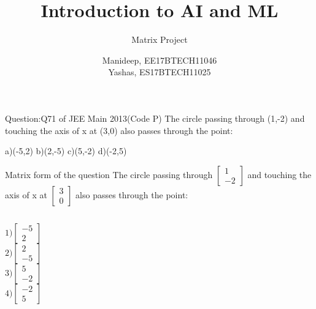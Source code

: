 \documentclass{beamer}
\title{Introduction to AI and ML}
\subtitle{Matrix Project}
\author{Manideep, EE17BTECH11046 \\ Yashas, ES17BTECH11025}
\begin{document}
\begin{frame}

\titlepage
 
\end{frame}  

\begin{frame}[t]{Question:Q71 of JEE Main 2013(Code P)}
\vspace{5em}
The circle passing through (1,-2) and touching the axis of x at (3,0) also passes through the point:

\vspace{1.5em}
\hspace{1.5em} a)(-5,2) \hspace{1.5em} b)(2,-5) \hspace{1.5em} c)(5,-2) \hspace{1.5em} d)(-2,5)
\vspace{1.5em}
\end{frame}

\begin{frame}[t]{Matrix form of the question}
\vspace{5em}
The circle passing through
$
\begin{bmatrix}
1\\
-2
\end{bmatrix}$
and touching the axis of x at
$
\begin{bmatrix}
3\\
0
\end{bmatrix}$
also passes through the point:
\begin{columns}[onlytextwidth]
\[
1)\begin{bmatrix}
-5\\
2
\end{bmatrix}\]
\[2)\begin{bmatrix}
2\\
-5
\end{bmatrix}\] 
\[3)\begin{bmatrix}
5\\
-2
\end{bmatrix}\] 
\[4)\begin{bmatrix}
-2\\
5
\end{bmatrix} 
\]
\end{columns}
\end{frame}
\end{document}
